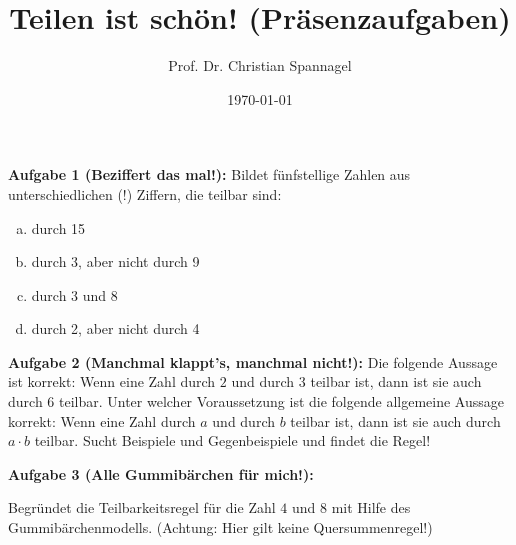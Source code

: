 \documentclass{../cssheet}
\title{Teilen ist schön! (Präsenzaufgaben)}
\author{Prof. Dr. Christian Spannagel}
\date{\today}
\begin{document}
\printtitle

\vspace*{10mm}


\textbf{Aufgabe 1 (Beziffert das mal!):}  Bildet fünfstellige Zahlen aus unterschiedlichen (!) Ziffern, die teilbar sind:
\begin{enumerate}[a)]
\item durch 15
\item durch 3, aber nicht durch 9
\item durch 3 und 8
\item durch 2, aber nicht durch 4
\end{enumerate}

\textbf{Aufgabe 2 (Manchmal klappt's, manchmal nicht!):} Die folgende Aussage ist korrekt: Wenn eine Zahl durch $2$ und durch $3$ teilbar ist, dann ist sie auch durch $6$ teilbar. Unter welcher Voraussetzung ist die folgende allgemeine Aussage korrekt: Wenn eine Zahl durch $a$ und durch $b$ teilbar ist, dann ist sie auch durch $a\cdot b$ teilbar.
Sucht Beispiele und Gegenbeispiele und findet die Regel!

\textbf{Aufgabe 3 (Alle Gummibärchen für mich!):}  

Begründet die Teilbarkeitsregel für die Zahl $4$ und $8$ mit Hilfe des Gummibärchenmodells. (Achtung: Hier gilt keine Quersummenregel!)


\vspace*{10mm}
\printlicense

\printsocials
\end{document}
